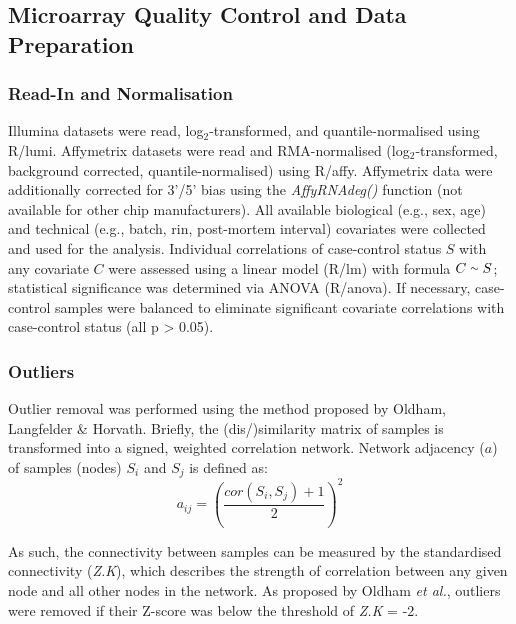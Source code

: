 \begin{method}
\subsection{Microarray Quality Control and Data Preparation}
\subsubsection{Read-In and Normalisation}
Illumina datasets were read, log$_2$-transformed, and quantile-normalised using R/lumi.\cite{Du2008} Affymetrix datasets were read and RMA-normalised (log$_2$-transformed, background corrected, quantile-normalised) using R/affy.\cite{Gautier2004} Affymetrix data were additionally corrected for 3'/5' bias using the \emph{AffyRNAdeg()} function (not available for other chip manufacturers). All available biological (e.g., sex, age) and technical (e.g., batch, \ac{rin}, post-mortem interval) covariates were collected and used for the analysis. Individual correlations of case-control status $S$ with any covariate $C$ were assessed using a linear model (R/lm) with formula $C \smallsim S$; statistical significance was determined via ANOVA (R/anova). If necessary, case-control samples were balanced to eliminate significant covariate correlations with case-control status (all p > 0.05).

\subsubsection{Outliers}
Outlier removal was performed using the method proposed by Oldham, Langfelder \& Horvath.\cite{Oldham2012} Briefly, the (dis\-/)similarity matrix of samples is transformed into a signed, weighted correlation network. Network adjacency ($a$) of samples (nodes) $S_i$ and $S_j$ is defined as: $$a_{ij} = \left(\frac{cor(S_i, S_j)+1}{2}\right)^2$$

As such, the connectivity between samples can be measured by the standardised connectivity (\emph{Z.K}), which describes the strength of correlation between any given node and all other nodes in the network. As proposed by Oldham \emph{et al.}, outliers were removed if their Z-score was below the threshold of \emph{Z.K} = -2.


\end{method}
